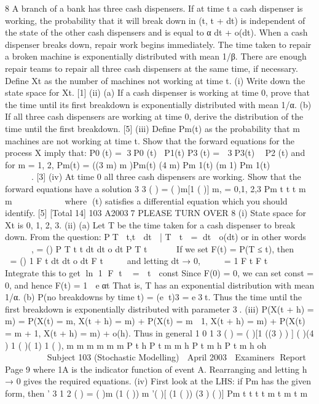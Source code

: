 
8 A branch of a bank has three cash dispensers. If at time t a cash dispenser is working,
the probability that it will break down in (t, t + dt) is independent of the state of the
other cash dispensers and is equal to
α dt + o(dt).
When a cash dispenser breaks down, repair work begins immediately. The time taken
to repair a broken machine is exponentially distributed with mean 1/β. There are
enough repair teams to repair all three cash dispensers at the same time, if necessary.
Define Xt as the number of machines not working at time t.
(i) Write down the state space for Xt. [1]
(ii) (a) If a cash dispenser is working at time 0, prove that the time until its
first breakdown is exponentially distributed with mean 1/α.
(b) If all three cash dispensers are working at time 0, derive the
distribution of the time until the first breakdown. [5]
(iii) Define Pm(t) as the probability that m machines are not working at time t.
Show that the forward equations for the process X imply that:
P0(t) = 3P0 (t) P1(t)
P3(t) =  3P3(t)  P2 (t)
and for m = 1, 2,
Pm(t) = ((3 m) m )Pm(t) (4 m) Pm 1(t) (m 1) Pm 1(t)              .
[3]
(iv) At time 0 all three cash dispensers are working. Show that the forward
equations have a solution
3 3
( ) = ( )m[1 ( )] m, = 0,1, 2,3
Pm t t t m
m

 
   
 
where (t) satisfies a differential equation which you should identify. [5]
[Total 14]
103 A20037 PLEASE TURN OVER
8 (i) State space for Xt is {0, 1, 2, 3}.
(ii) (a) Let T be the time taken for a cash dispenser to break down. From the
question:
PT t,t  dt  | T  t  = dt  o(dt)
or in other words
   
 
,
= ()
P T t t dt
dt o dt
P T t
 
 

If we set F(t) = P(T ≤ t), then
 
 
= ()
1
F t dt
dt o dt
F t

 

and letting dt → 0,
 
 
=
1
F t
F t



Integrate this to get ln 1 F t  =  t  const
Since F(0) = 0, we can set const = 0, and hence F(t) = 1  eαt
That is, T has an exponential distribution with mean 1/α.
(b) P(no breakdowns by time t) = (et)3 = e3t. Thus the time until the
first breakdown is exponentially distributed with parameter 3.
(iii) P(X(t + h) = m) = P(X(t) = m, X(t + h) = m) + P(X(t) = m  1, X(t + h) = m)
+ P(X(t) = m + 1, X(t + h) = m) + o(h).
Thus in general
1 0
1 3
( ) = ( )[1 ((3 ) ) ] ( )(4 ) 1
( )( 1) 1 ( ),
m m m m
m m
P t h P t m m h P t m h
P t m h oh
 
 
        
   
Subject 103 (Stochastic Modelling)  April 2003  Examiners Report
Page 9
where 1A is the indicator function of event A.
Rearranging and letting h → 0 gives the required equations.
(iv) First look at the LHS: if Pm has the given form, then
’ 3 1 2
( ) = ( )m (1 ( )) m ’( )[ (1 ( )) (3 ) ( )]
Pm t t t t m t m t
m
   

